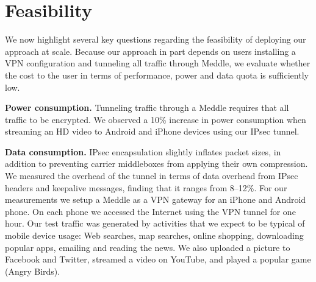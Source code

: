 \documentclass{sig-alternate-10pt}
\newcommand{\meddle}{{Meddle}\xspace}
\begin{document}

\section{Feasibility}
\label{sec:eval}
We now highlight several key questions regarding the feasibility of
deploying our approach at scale. Because our approach in part depends
on users installing a VPN configuration and tunneling all traffic
through \meddle, we evaluate whether the cost to the user in terms
of performance, power and data quota is sufficiently low. 

\noindent\textbf{Power consumption.} Tunneling traffic through a
\meddle requires that all traffic to be encrypted. We observed a 
10\% increase in power consumption when streaming an HD 
video to Android and iPhone devices using our IPsec tunnel. 

\noindent\textbf{Data consumption.} IPsec encapsulation slightly
inflates packet sizes, in addition to preventing carrier middleboxes
from applying their own compression. We measured the overhead of the
tunnel in terms of data overhead from IPsec headers and keepalive
messages, finding that it ranges from 8--12\%. For our measurements we
setup a \meddle as a VPN gateway for an iPhone and Android
phone. On each phone we accessed the Internet using the VPN tunnel for
one hour. Our test traffic was generated by activities that we 
expect to be typical of mobile device usage: Web searches, map
searches, online shopping, downloading popular apps, emailing and
reading the news. We also uploaded a picture to Facebook and Twitter,
streamed a video on YouTube, and played a popular game (Angry Birds).
\end{document}
